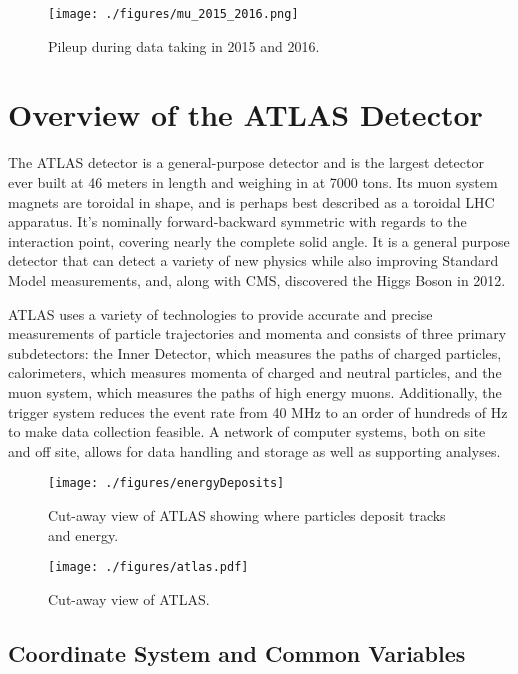 \begin{figure}[h!]
  \centering
	\texttt{[image: ./figures/mu\_2015\_2016.png]}
\caption{\label{fig:mu}{ Pileup during data taking in 2015 and 2016. }} %
\end{figure}

\section{Overview of the ATLAS Detector}
The ATLAS detector is a general-purpose detector and is the largest detector ever built at 46 meters in length and weighing in at 7000 tons.  Its muon system magnets are toroidal in shape, and is perhaps best described as a toroidal LHC apparatus.  It's nominally forward-backward symmetric with regards to the interaction point, covering nearly the complete solid angle.  It is a general purpose detector that can detect a variety of new physics while also improving Standard Model measurements, and, along with CMS, discovered the Higgs Boson in 2012.  

ATLAS uses a variety of technologies to provide accurate and precise measurements of particle trajectories and momenta and consists of three primary subdetectors: the Inner Detector, which measures the paths of charged particles, calorimeters, which measures momenta of charged and neutral particles, and the muon system, which measures the paths of high energy muons.  Additionally, the trigger system reduces the event rate from 40 MHz to an order of hundreds of Hz to make data collection feasible.  A network of computer systems, both on site and off site, allows for data handling and storage as well as supporting analyses.

\begin{figure}[h!]
  \centering
	\texttt{[image: ./figures/energyDeposits]}
\caption{\label{fig:energyDeposits}{ Cut-away view of ATLAS showing where particles deposit tracks and energy. }} %
\end{figure}


\begin{figure}[h!]
  \centering
	\texttt{[image: ./figures/atlas.pdf]}
\caption{\label{fig:atlas}{ Cut-away view of ATLAS. }} %
\end{figure}


\subsection{Coordinate System and Common Variables}

